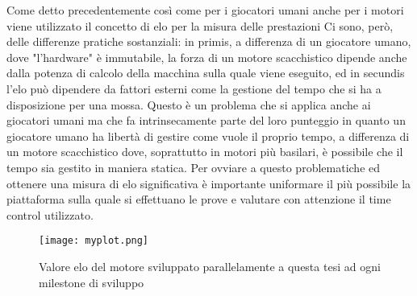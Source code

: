 Come detto precedentemente così come per i giocatori umani anche per i motori viene utilizzato il concetto di elo per la misura delle prestazioni Ci sono, però, delle differenze pratiche sostanziali: in primis,
a differenza di un giocatore umano, dove "l'hardware" è immutabile, la forza di un motore scacchistico dipende anche dalla potenza di calcolo della macchina sulla quale viene eseguito, ed in secundis l'elo può dipendere 
da fattori esterni come la gestione del tempo che si ha a disposizione per una mossa. Questo è un problema che si applica anche ai giocatori umani ma che fa intrinsecamente parte del loro punteggio in quanto 
un giocatore umano ha libertà di gestire come vuole il proprio tempo, a differenza di un motore scacchistico dove, soprattutto in motori più basilari, è possibile che il tempo sia gestito in maniera statica.
Per ovviare a questo problematiche ed ottenere una misura di elo significativa è importante uniformare il più possibile la piattaforma sulla quale si effettuano le prove e valutare con attenzione il time control utilizzato.

\begin{figure}[h]
    \centering
    \texttt{[image: myplot.png]}
    \caption{Valore elo del motore sviluppato parallelamente a questa tesi ad ogni milestone di sviluppo}
\end{figure}

